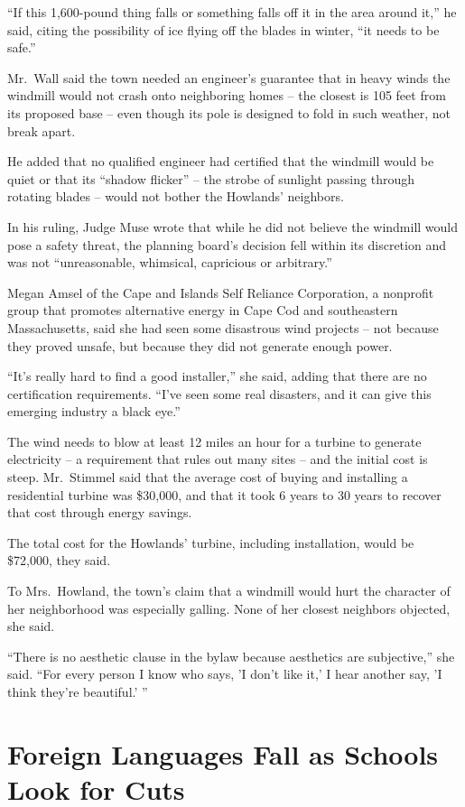 ﻿\documentclass[12pt]{article}
\begin{document}
``If this 1,600-pound thing falls or something falls off it in the area around it,'' he said, citing
the possibility of ice flying off the blades in winter, ``it needs to be safe.''

Mr.~Wall said the town needed an engineer's guarantee that in heavy winds the windmill would not
crash onto neighboring homes -- the closest is 105 feet from its proposed base -- even though its
pole is designed to fold in such weather, not break apart.

He added that no qualified engineer had certified that the windmill would be quiet or that its
``shadow flicker'' -- the strobe of sunlight passing through rotating blades -- would not bother the
Howlands' neighbors.

In his ruling, Judge Muse wrote that while he did not believe the windmill would pose a safety
threat, the planning board's decision fell within its discretion and was not ``unreasonable,
whimsical, capricious or arbitrary.''

Megan Amsel of the Cape and Islands Self Reliance Corporation, a nonprofit group that promotes
alternative energy in Cape Cod and southeastern Massachusetts, said she had seen some disastrous
wind projects -- not because they proved unsafe, but because they did not generate enough power.

``It's really hard to find a good installer,'' she said, adding that there are no certification
requirements. ``I've seen some real disasters, and it can give this emerging industry a black eye.''

The wind needs to blow at least 12 miles an hour for a turbine to generate electricity -- a
requirement that rules out many sites -- and the initial cost is steep. Mr.~Stimmel said that the
average cost of buying and installing a residential turbine was \$30,000, and that it took 6 years
to 30 years to recover that cost through energy savings.

The total cost for the Howlands' turbine, including installation, would be \$72,000, they said.

To Mrs.~Howland, the town's claim that a windmill would hurt the character of her neighborhood was
especially galling. None of her closest neighbors objected, she said.

``There is no aesthetic clause in the bylaw because aesthetics are subjective,'' she said. ``For
every person I know who says, 'I don't like it,' I hear another say, 'I think they're beautiful.' ''


\section{Foreign Languages Fall as Schools Look for Cuts}
\end{document}
